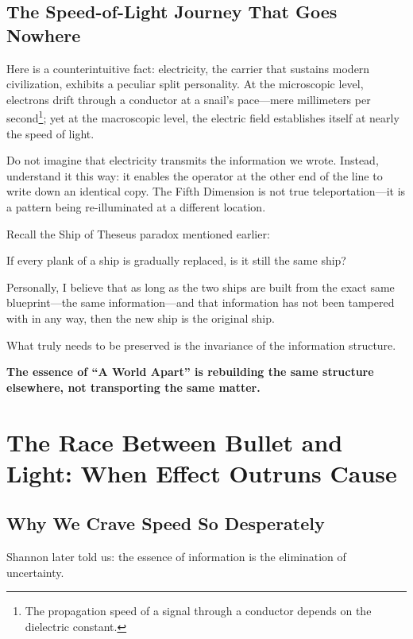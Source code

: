 \subsection{The Speed-of-Light Journey That Goes Nowhere}

Here is a counterintuitive fact: electricity, the carrier that sustains modern civilization, exhibits a peculiar split personality. At the microscopic level, electrons drift through a conductor at a snail's pace---mere millimeters per second\footnote{The propagation speed of a signal through a conductor depends on the dielectric constant.}; yet at the macroscopic level, the electric field establishes itself at nearly the speed of light.

Do not imagine that electricity transmits the information we wrote. Instead, understand it this way: it enables the operator at the other end of the line to write down an identical copy. The Fifth Dimension is not true teleportation---it is a pattern being re-illuminated at a different location.

\vspace{1em}

Recall the Ship of Theseus paradox mentioned earlier:

If every plank of a ship is gradually replaced, is it still the same ship?

\vspace{1em}

Personally, I believe that as long as the two ships are built from the exact same blueprint---the same information---and that information has not been tampered with in any way, then the new ship is the original ship.

What truly needs to be preserved is the invariance of the information structure.


\textbf{The essence of ``A World Apart'' is rebuilding the same structure elsewhere, not transporting the same matter.}


\section{The Race Between Bullet and Light: When Effect Outruns Cause}

\subsection{Why We Crave Speed So Desperately}

Shannon later told us: the essence of information is the elimination of uncertainty.

